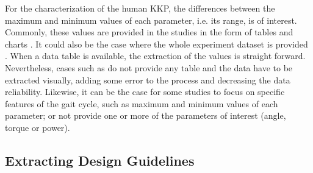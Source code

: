 For the characterization of the human KKP, the differences between the maximum and minimum values of each parameter, i.e. its range, is of interest. Commonly, these values are provided in the studies in the form of tables and charts \cite{han2011biomechanical,yali2010biomechanics}. It could also be the case where the whole experiment dataset is provided \cite{moore2015elaborate}. When a data table is available, the extraction of the values is straight forward. Nevertheless, cases such as \cite{protopapadaki2007hip,riener2002stair,mcintosh2006gait,roebroeck1994biomechanics,mak2003joint} do not provide any table and the data have to be extracted visually, adding some error to the process and decreasing the data reliability. Likewise, it can be the case for some studies to focus on specific features of the gait cycle, such as maximum and minimum values of each parameter; or not provide one or more of the parameters of interest (angle, torque or power).

\subsection{Extracting Design Guidelines}

